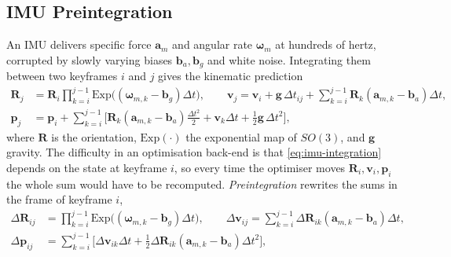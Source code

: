 \subsection{IMU Preintegration}
\label{subsec:imu-preintegration}
An IMU delivers specific force $\mathbf{a}_m$ and angular rate $\boldsymbol{\omega}_m$ at hundreds of hertz, corrupted by slowly varying biases $\mathbf{b}_a,\mathbf{b}_g$ and white noise. Integrating them between two keyframes $i$ and $j$ gives the kinematic prediction
\begin{align}
\mathbf{R}_j&=\mathbf{R}_i\prod_{k=i}^{j-1}\mathrm{Exp}\big((\boldsymbol{\omega}_{m,k}-\mathbf{b}_g)\Delta t\big),\qquad
\mathbf{v}_j=\mathbf{v}_i+\mathbf{g}\,\Delta t_{ij}+\sum_{k=i}^{j-1}\mathbf{R}_k(\mathbf{a}_{m,k}-\mathbf{b}_a)\Delta t,\nonumber\\
\mathbf{p}_j&=\mathbf{p}_i+\sum_{k=i}^{j-1}\Big[\mathbf{R}_k(\mathbf{a}_{m,k}-\mathbf{b}_a)\tfrac{\Delta t^{2}}{2}+\mathbf{v}_k\Delta t+\tfrac12\mathbf{g}\,\Delta t^{2}\Big],
\label{eq:imu-integration}
\end{align}
where $\mathbf{R}$ is the orientation, $\mathrm{Exp}(\cdot)$ the exponential map of $SO(3)$, and $\mathbf{g}$ gravity. The difficulty in an optimisation back-end is that \eqref{eq:imu-integration} depends on the state at keyframe $i$, so every time the optimiser moves $\mathbf{R}_i,\mathbf{v}_i,\mathbf{p}_i$ the whole sum would have to be recomputed. \emph{Preintegration} \cite{forster2017_preintegration} rewrites the sums in the frame of keyframe $i$,
\begin{align}
\Delta\mathbf{R}_{ij}&=\prod_{k=i}^{j-1}\mathrm{Exp}\big((\boldsymbol{\omega}_{m,k}-\mathbf{b}_g)\Delta t\big),\qquad
\Delta\mathbf{v}_{ij}=\sum_{k=i}^{j-1}\Delta\mathbf{R}_{ik}(\mathbf{a}_{m,k}-\mathbf{b}_a)\Delta t,\nonumber\\
\Delta\mathbf{p}_{ij}&=\sum_{k=i}^{j-1}\Big[\Delta\mathbf{v}_{ik}\Delta t+\tfrac12\Delta\mathbf{R}_{ik}(\mathbf{a}_{m,k}-\mathbf{b}_a)\Delta t^{2}\Big],
\label{eq:imu-preintegration}
\end{align}
